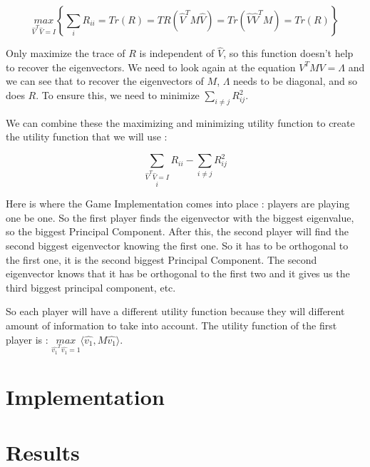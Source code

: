 $$\underset{\hat{V}^T \hat{V} = I}{max} \left\{ \sum\limits_{i} R_{ii} = Tr(R) = TR\left(\hat{V}^T M \hat{V}\right) = Tr\left(\hat{V} \hat{V}^T M\right) = Tr(R) \right\}$$

Only maximize the trace of $R$ is independent of $\hat{V}$, so this function doesn't help to recover the eigenvectors. We need to look again at the equation $V^T M V = \Lambda$ and we can see that to recover the eigenvectors of $M$, $\Lambda$ needs to be diagonal, and so does $R$. To ensure this, we need to minimize $\displaystyle \sum\limits_{i \neq j} R_{ij}^2$.

We can combine these the maximizing and minimizing utility function to create the utility function that we will use :

$$\underset{\hat{V}^T \hat{V} = I} \sum\limits_i R_{ii} - \sum\limits_{i \neq j} R_{ij}^2$$

Here is where the Game Implementation comes into place : players are playing one be one. So the first player finds the eigenvector with the biggest eigenvalue, so the biggest Principal Component. After this, the second player will find the second biggest eigenvector knowing the first one. So it has to be orthogonal to the first one, it is the second biggest Principal Component. The second eigenvector knows that it has be orthogonal to the first two and it gives us the third biggest principal component, etc.

So each player will have a different utility function because they will different amount of information to take into account. The utility function of the first player is : $\underset{\hat{v_1}^T \hat{v_1} = 1}{max} \langle \hat{v_1}, M \hat{v_1} \rangle$. 

\section{Implementation}

\section{Results}
